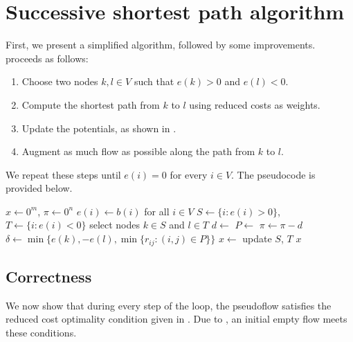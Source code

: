 \section{Successive shortest path algorithm}

First, we present a simplified algorithm, followed by some improvements.
 proceeds as follows:
\begin{enumerate}
    \item Choose two nodes $k, l \in V$ such that $e(k) > 0$ and $e(l) < 0$.
    \item Compute the shortest path from $k$ to $l$ using reduced costs as weights.
    \item Update the potentials, as shown in .
    \item Augment as much flow as possible along the path from $k$ to $l$.
\end{enumerate}

We repeat these steps until $e(i) = 0$ for every $i \in V$. The pseudocode is provided below.

\begin{algorithm}[H]
\caption{\textsc{SuccessiveShortestPathAlgorithm}$(G,b,c,u)$}
\label{alg:succ_shortest}
    \begin{algorithmic}[1]
        \State $x \gets 0^m$, $\pi \gets 0^n$
        \State $e(i) \gets b(i)$ for all $i \in V$
        \State $S \gets \{i\colon e(i)> 0 \}$, $T \gets \{ i\colon e(i) <0\}$
        \State select nodes $k\in S$ and $l \in T$ 
        \State $d\gets $  
        \State $P \gets $  
        \State $\pi \gets \pi - d$
        \State $\delta \gets \min \{e(k), -e(l), \min\{r_{ij}\colon (i,j)\in P\}\}$ 
        \State $x \gets$ 
        \State update $S$, $T$
        \EndWhile
        \State \Return $x$
    \end{algorithmic}
\end{algorithm}

\subsection{Correctness}

We now show that during every step of the loop, the pseudoflow satisfies the reduced cost optimality condition given in . Due to , an initial empty flow meets these conditions. 

